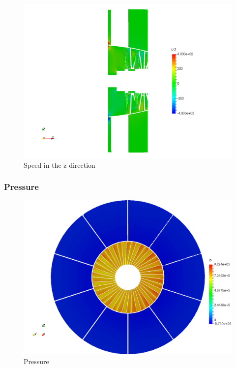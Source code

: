 \begin{figure}[h!]
\centering
\includegraphics[scale=0.28]{./img/screenshoots/Uz2.png}
\caption{Speed in the z direction}
\label{uz2}
\end{figure}

\newpage\subsubsection{Pressure}

\begin{figure}[h!]
\centering
\includegraphics[scale=0.28]{./img/screenshoots/p1.png}
\caption{Pressure}
\label{p1}
\end{figure}


